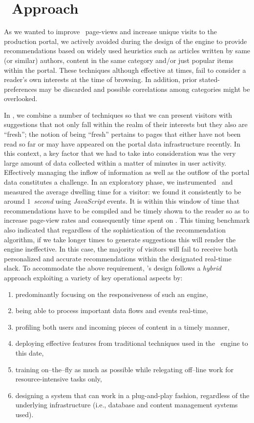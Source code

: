 
\section{\poly\ Approach
\label{approach}}

As we wanted to improve \poly\ page-views and increase unique 
visits to the production portal, we actively avoided during the 
design of the engine to provide recommendations based on 
widely used heuristics such as articles written by same (or similar) 
authors, content in the same category and/or just popular items 
within the portal.
These techniques although effective at times, fail to consider 
a reader's own interests at the time of browsing. In addition, 
prior stated-preferences may be discarded and possible correlations 
among categories might be overlooked.


In \poly, we combine a number of techniques so that we can 
present visitors with suggestions that not only fall within 
the realm of their interests but they also are ``fresh''; 
the notion of being ``fresh'' pertains to pages 
that either have not been read so far or 
may have appeared on the portal data infrastructure recently. 
In this context, a key factor that we had to take into consideration 
was the very large
amount of data collected within a matter of minutes 
in user activity.
Effectively managing the inflow of information as well as 
the outflow of the portal data constitutes a challenge.
In an exploratory phase, we instrumented \vurl\ and measured 
the average dwelling time for a visitor: we found it consistently 
to be around $1$~\emph{second} using {\sl JavaScript} events.
It is within this window of time that recommendations have 
to be compiled and be timely shown to the reader so as 
to increase page-view rates and consequently time spent 
on \vurl.
This timing benchmark also indicated that regardless of the 
sophistication of the recommendation algorithm, if we take 
longer times to generate suggestions this will render 
the engine ineffective.
In this case, the majority of visitors will fail 
to receive both personalized and accurate recommendations 
within the designated real-time slack.
% 
To accommodate the above requirement, \poly's design 
follows a \emph{hybrid} approach 
exploiting a variety of key operational aspects by:
\begin{enumerate}
	\item predominantly focusing on the responsiveness of such an engine,
	\item being able to process important data flows and events real-time,
	\item profiling both users and incoming pieces of content in a timely manner,
	\item deploying effective features from traditional techniques
		used in the \vurl\ engine to this date, 
	\item training on--the--fly as much as possible while 
		relegating off--line work for resource-intensive tasks only,
	\item designing a system that can work in a plug-and-play fashion, 
		regardless of the underlying infrastructure (i.e., database and content 
		management systems used).
\end{enumerate}
